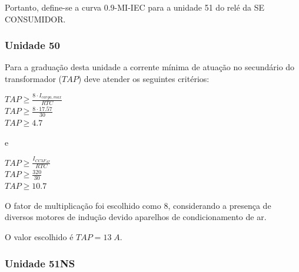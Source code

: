 Portanto, define-se a curva 0.9-MI-IEC para a unidade 51 do relé da SE CONSUMIDOR.


\subsubsection{Unidade 50}

Para a graduação desta unidade a corrente mínima de atuação no secundário do transformador ($TAP$) deve atender os seguintes critérios:

\begin{center}
$TAP \geq \frac{8 \cdot I_{carga,max}}{RTC}$ \\ \vspace{5pt}
$TAP \geq \frac{8 \cdot 17.57}{30} $ \\ \vspace{5pt}
$TAP \geq  4.7$ \\ \vspace{5pt}
\end{center}

e

\begin{center}
$TAP \geq \frac{I_{CC3F_{AT}}}{RTC}$ \\ \vspace{5pt}
$TAP \geq \frac{320}{30} $ \\ \vspace{5pt}
$TAP \geq  10.7$ \\ \vspace{5pt}
\end{center}

O fator de multiplicação foi escolhido como 8, considerando a presença de diversos motores de indução devido aparelhos de condicionamento de ar.

O valor escolhido é $TAP = 13 \; A$. 

\subsubsection{Unidade 51NS}

